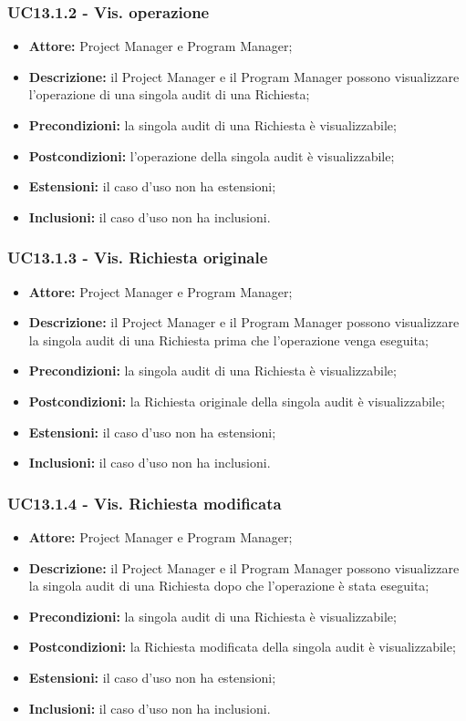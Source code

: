 \subsubsection*{UC13.1.2 - Vis. operazione}
\begin{itemize}[label=$\circ$]
\item \textbf{Attore:} Project Manager e Program Manager;
\item \textbf{Descrizione:} il Project Manager e il Program Manager possono visualizzare l'operazione di una singola audit di una Richiesta;
\item \textbf{Precondizioni:} la singola audit di una Richiesta è visualizzabile;
\item \textbf{Postcondizioni:} l'operazione della singola audit è visualizzabile;
\item \textbf{Estensioni:} il caso d'uso non ha estensioni;
\item \textbf{Inclusioni:} il caso d'uso non ha inclusioni.
\end{itemize}

\subsubsection*{UC13.1.3 - Vis. Richiesta originale}
\begin{itemize}[label=$\circ$]
\item \textbf{Attore:} Project Manager e Program Manager;
\item \textbf{Descrizione:} il Project Manager e il Program Manager possono visualizzare la singola audit di una Richiesta prima che l'operazione venga eseguita;
\item \textbf{Precondizioni:} la singola audit di una Richiesta è visualizzabile;
\item \textbf{Postcondizioni:} la Richiesta originale della singola audit è visualizzabile;
\item \textbf{Estensioni:} il caso d'uso non ha estensioni;
\item \textbf{Inclusioni:} il caso d'uso non ha inclusioni.
\end{itemize}

\subsubsection*{UC13.1.4 - Vis. Richiesta modificata}
\begin{itemize}[label=$\circ$]
\item \textbf{Attore:} Project Manager e Program Manager;
\item \textbf{Descrizione:} il Project Manager e il Program Manager possono visualizzare la singola audit di una Richiesta dopo che l'operazione è stata eseguita;
\item \textbf{Precondizioni:} la singola audit di una Richiesta è visualizzabile;
\item \textbf{Postcondizioni:} la Richiesta modificata della singola audit è visualizzabile;
\item \textbf{Estensioni:} il caso d'uso non ha estensioni;
\item \textbf{Inclusioni:} il caso d'uso non ha inclusioni.
\end{itemize}

